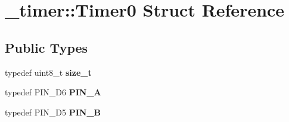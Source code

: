 \hypertarget{struct__timer_1_1Timer0}{}\section{\+\_\+timer\+:\+:Timer0 Struct Reference}
\label{struct__timer_1_1Timer0}
\subsection*{Public Types}
\begin{DoxyCompactItemize}
\item 
\hypertarget{struct__timer_1_1Timer0_ae657967e46144d5bd2581d9551ee58d9}{}\label{struct__timer_1_1Timer0_ae657967e46144d5bd2581d9551ee58d9} 
typedef uint8\+\_\+t {\bfseries size\+\_\+t}
\item 
\hypertarget{struct__timer_1_1Timer0_a29d1da3676a5022eae7322a5d92e5549}{}\label{struct__timer_1_1Timer0_a29d1da3676a5022eae7322a5d92e5549} 
typedef P\+I\+N\+\_\+\+D6 {\bfseries P\+I\+N\+\_\+A}
\item 
\hypertarget{struct__timer_1_1Timer0_afff9d9d179772b8a79508e46580f0cf0}{}\label{struct__timer_1_1Timer0_afff9d9d179772b8a79508e46580f0cf0} 
typedef P\+I\+N\+\_\+\+D5 {\bfseries P\+I\+N\+\_\+B}
\end{DoxyCompactItemize}
